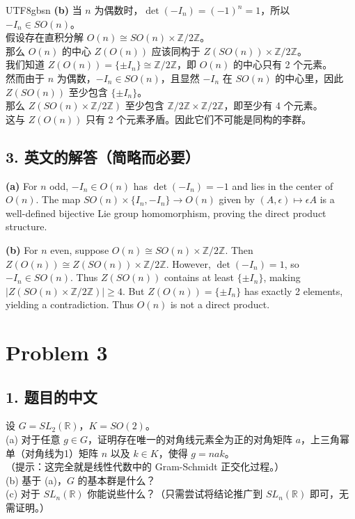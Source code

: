 \documentclass{article}
\begin{document}
\begin{CJK*}{UTF8}{gbsn}
\textbf{(b)} 当 $n$ 为偶数时，$\det(-I_n) = (-1)^n = 1$，所以 $-I_n \in SO(n)$。\\
假设存在直积分解 $O(n) \cong SO(n) \times \mathbb{Z}/2\mathbb{Z}$。\\
那么 $O(n)$ 的中心 $Z(O(n))$ 应该同构于 $Z(SO(n)) \times \mathbb{Z}/2\mathbb{Z}$。\\
我们知道 $Z(O(n)) = \{\pm I_n\} \cong \mathbb{Z}/2\mathbb{Z}$，即 $O(n)$ 的中心只有 2 个元素。\\
然而由于 $n$ 为偶数，$-I_n \in SO(n)$，且显然 $-I_n$ 在 $SO(n)$ 的中心里，因此 $Z(SO(n))$ 至少包含 $\{\pm I_n\}$。\\
那么 $Z(SO(n) \times \mathbb{Z}/2\mathbb{Z})$ 至少包含 $\mathbb{Z}/2\mathbb{Z} \times \mathbb{Z}/2\mathbb{Z}$，即至少有 4 个元素。\\
这与 $Z(O(n))$ 只有 2 个元素矛盾。因此它们不可能是同构的李群。

\subsection*{3. 英文的解答（简略而必要）}
\textbf{(a)} For $n$ odd, $-I_n \in O(n)$ has $\det(-I_n) = -1$ and lies in the center of $O(n)$. The map $SO(n) \times \{I_n, -I_n\} \to O(n)$ given by $(A, \epsilon) \mapsto \epsilon A$ is a well-defined bijective Lie group homomorphism, proving the direct product structure.

\textbf{(b)} For $n$ even, suppose $O(n) \cong SO(n) \times \mathbb{Z}/2\mathbb{Z}$. Then $Z(O(n)) \cong Z(SO(n)) \times \mathbb{Z}/2\mathbb{Z}$. However, $\det(-I_n) = 1$, so $-I_n \in SO(n)$. Thus $Z(SO(n))$ contains at least $\{\pm I_n\}$, making $|Z(SO(n) \times \mathbb{Z}/2\mathbb{Z})| \ge 4$. But $Z(O(n)) = \{\pm I_n\}$ has exactly 2 elements, yielding a contradiction. Thus $O(n)$ is not a direct product.

\vspace{1em}

\section*{Problem 3}

\subsection*{1. 题目的中文}
设 $G = SL_2(\mathbb{R})$，$K = SO(2)$。\\
(a) 对于任意 $g \in G$，证明存在唯一的对角线元素全为正的对角矩阵 $a$，上三角幂单（对角线为1）矩阵 $n$ 以及 $k \in K$，使得 $g = nak$。\\
（提示：这完全就是线性代数中的 Gram-Schmidt 正交化过程。）\\
(b) 基于 (a)，$G$ 的基本群是什么？\\
(c) 对于 $SL_n(\mathbb{R})$ 你能说些什么？（只需尝试将结论推广到 $SL_n(\mathbb{R})$ 即可，无需证明。）


\end{CJK*}
\end{document}
